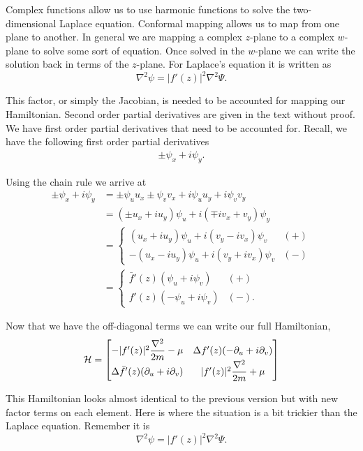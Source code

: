Complex functions allow us to use harmonic functions to solve the two-dimensional Laplace equation.
Conformal mapping allows us to map from one plane to another.
In general we are mapping a complex $z$-plane to a complex $w$-plane to solve some sort of equation.
Once solved in the $w$-plane we can write the solution back in terms of the $z$-plane.
For Laplace's equation it is written as
\begin{equation}
  \nabla^2 \psi = |f'(z)|^2\nabla^2\Psi.
\end{equation}

This factor, or simply the Jacobian, is needed to be accounted for mapping our Hamiltonian.
Second order partial derivatives are given in the text without proof.
We have first order partial derivatives that need to be accounted for.
Recall, we have the following first order partial derivatives
\begin{align}
  \pm \psi_x + i \psi_y. 
\end{align}

Using the chain rule we arrive at
\begin{align}
  \pm \psi_x + i \psi_y &= \pm \psi_u u_x \pm \psi_v v_x + i \psi_u u_y + i \psi_v v_y \\
  &= (\pm u_x + i u_y) \psi_u + i(\mp i v_x + v_y) \psi_y \\
  &=
  \begin{cases}
    (u_x + i u_y) \psi_u + i (v_y - i v_x) \psi_v & (+) \\
    -(u_x - i u_y) \psi_u + i (v_y + i v_x) \psi_v & (-)
  \end{cases} \\
  &=
  \begin{cases}
    \bar{f}'(z) (\psi_u + i \psi_v) & (+) \\
    f'(z) (-\psi_u + i \psi_v) & (-).
  \end{cases}
\end{align}

Now that we have the off-diagonal terms we can write our full Hamiltonian,
\begin{align}
  \mathcal{H} = 
  \begin{bmatrix}
    -|f'(z)|^2\dfrac{\nabla^2}{2m} - \mu & \Delta f'(z) (-\partial_u + i \partial_v) \\
    \Delta \bar{f}'(z)(\partial_u +i\partial_v) & |f'(z)|^2\dfrac{\nabla^2}{2m} + \mu
  \end{bmatrix}
\end{align}

This Hamiltonian looks almost identical to the previous version but with new factor terms on each element.
Here is where the situation is a bit trickier than the Laplace equation.
Remember it is
\begin{equation}
  \nabla^2 \psi = |f'(z)|^2\nabla^2\Psi.
\end{equation}

